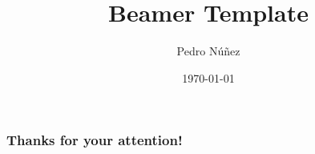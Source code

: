 \documentclass[12pt]{beamer}
\title[Beamer Template]{Beamer Template}
\author{Pedro N\'{u}\~{n}ez}
\institute{Albert-Ludwigs-Universit\"{a}t Freiburg}
\date{\today}
\begin{document}
\frame{\titlepage}

\begin{frame}
    \frametitle{Thanks for your attention!}
		
		
\end{frame}
\end{document}
